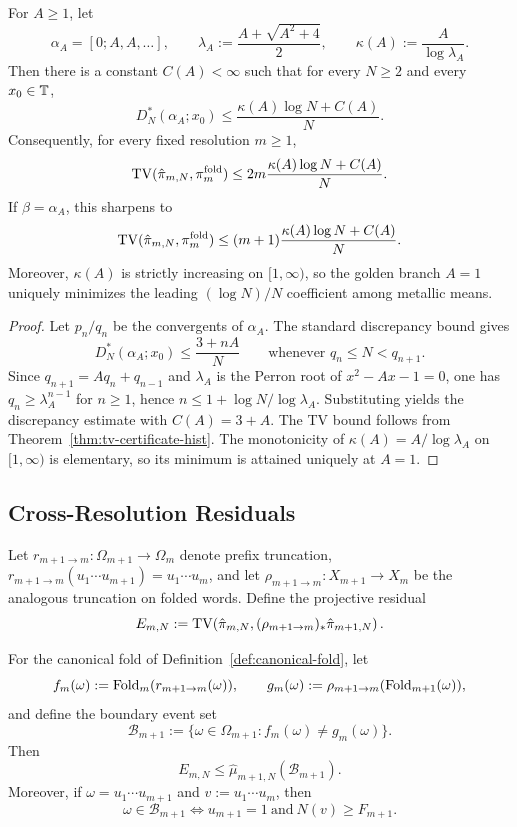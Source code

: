 \begin{corollary}
\label{cor:metallic-mean-golden-unique-optimal-tv-constant}
For $A\ge 1$, let
\[
\alpha_A=[0;A,A,\dots],\qquad
\lambda_A:=\frac{A+\sqrt{A^2+4}}{2},\qquad
\kappa(A):=\frac{A}{\log\lambda_A}.
\]
Then there is a constant $C(A)<\infty$ such that for every $N\ge 2$ and every
$x_0\in\mathbb{T}$,
\[
D_N^*(\alpha_A;x_0)\le \frac{\kappa(A)\log N+C(A)}{N}.
\]
Consequently, for every fixed resolution $m\ge 1$,
\[
\operatorname{TV}(\hat\pi_{m,N},\pi_m^{\mathrm{fold}})
\le
2m\frac{\kappa(A)\log N+C(A)}{N}.
\]
If \(\beta=\alpha_A\), this sharpens to
\[
\operatorname{TV}(\hat\pi_{m,N},\pi_m^{\mathrm{fold}})
\le
(m+1)\frac{\kappa(A)\log N+C(A)}{N}.
\]
Moreover, $\kappa(A)$ is strictly increasing on $[1,\infty)$, so the golden
branch $A=1$ uniquely minimizes the leading $(\log N)/N$ coefficient among
metallic means.
\end{corollary}

\begin{proof}
Let $p_n/q_n$ be the convergents of $\alpha_A$.  The standard discrepancy bound
\cite{KuipersNiederreiter1974} gives
\[
D_N^*(\alpha_A;x_0)\le \frac{3+nA}{N}
\qquad \text{whenever } q_n\le N<q_{n+1}.
\]
Since $q_{n+1}=Aq_n+q_{n-1}$ and $\lambda_A$ is the Perron root of
$x^2-Ax-1=0$, one has $q_n\ge \lambda_A^{n-1}$ for $n\ge 1$, hence
$n\le 1+\log N/\log\lambda_A$.  Substituting yields the discrepancy estimate
with $C(A)=3+A$.  The TV bound follows from
Theorem~\ref{thm:tv-certificate-hist}.  The monotonicity of
$\kappa(A)=A/\log\lambda_A$ on $[1,\infty)$ is elementary, so its minimum is
attained uniquely at $A=1$.
\end{proof}

\subsection{Cross-Resolution Residuals}

Let $r_{m+1\to m}:\Omega_{m+1}\to\Omega_m$ denote prefix truncation,
$r_{m+1\to m}(u_1\cdots u_{m+1})=u_1\cdots u_m$, and let
$\rho_{m+1\to m}:X_{m+1}\to X_m$ be the analogous truncation on folded words.
Define the projective residual
\[
E_{m,N}
:=
\operatorname{TV}\!\left(\hat\pi_{m,N},(\rho_{m+1\to m})_*\hat\pi_{m+1,N}\right).
\]

\begin{theorem}\label{prop:multiscale-residual-by-boundary}
For the canonical fold of Definition~\ref{def:canonical-fold}, let
\[
f_m(\omega):=\mathrm{Fold}_m(r_{m+1\to m}(\omega)),
\qquad
g_m(\omega):=\rho_{m+1\to m}(\mathrm{Fold}_{m+1}(\omega)),
\]
and define the boundary event set
\[
\mathcal{B}_{m+1}:=\{\omega\in\Omega_{m+1}: f_m(\omega)\neq g_m(\omega)\}.
\]
Then
\[
E_{m,N}\le \hat\mu_{m+1,N}(\mathcal{B}_{m+1}).
\]
Moreover, if \(\omega=u_1\cdots u_{m+1}\) and \(v:=u_1\cdots u_m\), then
\[
\omega\in\mathcal{B}_{m+1}
\iff
u_{m+1}=1\ \text{and}\ N(v)\ge F_{m+1}.
\]
\end{theorem}

